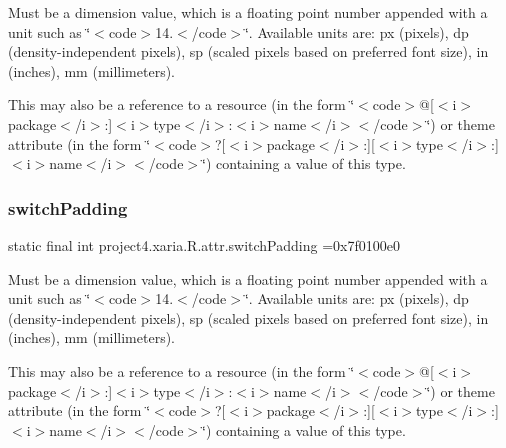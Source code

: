 Must be a dimension value, which is a floating point number appended with a unit such as \char`\"{}$<$code$>$14.\+5sp$<$/code$>$\char`\"{}. Available units are\+: px (pixels), dp (density-\/independent pixels), sp (scaled pixels based on preferred font size), in (inches), mm (millimeters). 

This may also be a reference to a resource (in the form \char`\"{}$<$code$>$@\mbox{[}$<$i$>$package$<$/i$>$\+:\mbox{]}$<$i$>$type$<$/i$>$\+:$<$i$>$name$<$/i$>$$<$/code$>$\char`\"{}) or theme attribute (in the form \char`\"{}$<$code$>$?\mbox{[}$<$i$>$package$<$/i$>$\+:\mbox{]}\mbox{[}$<$i$>$type$<$/i$>$\+:\mbox{]}$<$i$>$name$<$/i$>$$<$/code$>$\char`\"{}) containing a value of this type. \mbox{\label{classproject4_1_1xaria_1_1R_1_1attr_aaa8b1dbf5d71bd53ee0ab55a73569feb}} 
\subsubsection{\texorpdfstring{switch\+Padding}{switchPadding}}
{\footnotesize\ttfamily static final int project4.\+xaria.\+R.\+attr.\+switch\+Padding =0x7f0100e0\hspace{0.3cm}{\ttfamily [static]}}

Must be a dimension value, which is a floating point number appended with a unit such as \char`\"{}$<$code$>$14.\+5sp$<$/code$>$\char`\"{}. Available units are\+: px (pixels), dp (density-\/independent pixels), sp (scaled pixels based on preferred font size), in (inches), mm (millimeters). 

This may also be a reference to a resource (in the form \char`\"{}$<$code$>$@\mbox{[}$<$i$>$package$<$/i$>$\+:\mbox{]}$<$i$>$type$<$/i$>$\+:$<$i$>$name$<$/i$>$$<$/code$>$\char`\"{}) or theme attribute (in the form \char`\"{}$<$code$>$?\mbox{[}$<$i$>$package$<$/i$>$\+:\mbox{]}\mbox{[}$<$i$>$type$<$/i$>$\+:\mbox{]}$<$i$>$name$<$/i$>$$<$/code$>$\char`\"{}) containing a value of this type. \mbox{\label{classproject4_1_1xaria_1_1R_1_1attr_a4cabf775417abfb468ec6ba52c519801}} 
